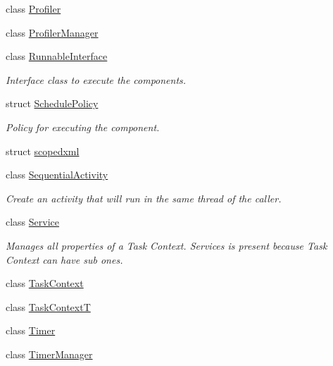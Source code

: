\begin{DoxyCompactItemize}
class \hyperlink{classcoco_1_1_profiler}{Profiler}
\item 
class \hyperlink{classcoco_1_1_profiler_manager}{Profiler\+Manager}
\item 
class \hyperlink{classcoco_1_1_runnable_interface}{Runnable\+Interface}
\begin{DoxyCompactList}\small\item\em Interface class to execute the components. \end{DoxyCompactList}\item 
struct \hyperlink{structcoco_1_1_schedule_policy}{Schedule\+Policy}
\begin{DoxyCompactList}\small\item\em Policy for executing the component. \end{DoxyCompactList}\item 
struct \hyperlink{structcoco_1_1scopedxml}{scopedxml}
\item 
class \hyperlink{classcoco_1_1_sequential_activity}{Sequential\+Activity}
\begin{DoxyCompactList}\small\item\em Create an activity that will run in the same thread of the caller. \end{DoxyCompactList}\item 
class \hyperlink{classcoco_1_1_service}{Service}
\begin{DoxyCompactList}\small\item\em Manages all properties of a Task Context. Services is present because Task Context can have sub ones. \end{DoxyCompactList}\item 
class \hyperlink{classcoco_1_1_task_context}{Task\+Context}
\item 
class \hyperlink{classcoco_1_1_task_context_t}{Task\+Context\+T}
\item 
class \hyperlink{classcoco_1_1_timer}{Timer}
\item 
class \hyperlink{classcoco_1_1_timer_manager}{Timer\+Manager}
\end{DoxyCompactItemize}
